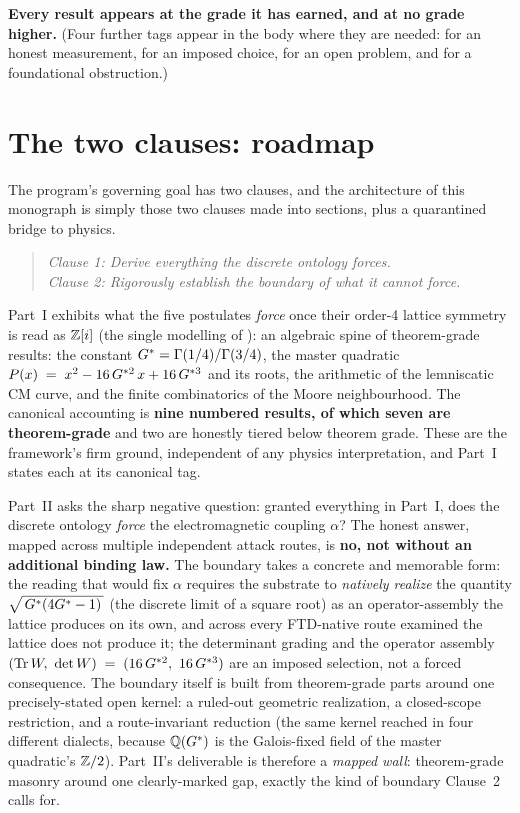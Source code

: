 \medskip
\noindent\textbf{Every result appears at the grade it has earned, and at no
grade higher.} (Four further tags appear in the body where they are
needed:  for an honest measurement,  for an imposed
choice,  for an open problem, and  for a foundational
obstruction.)

\section{The two clauses: roadmap}\label{sec:roadmap}
The program's governing goal has two clauses, and the architecture of this
monograph is simply those two clauses made into sections, plus a quarantined
bridge to physics.
\begin{quote}\itshape
  Clause 1: Derive everything the discrete ontology forces.\\
  Clause 2: Rigorously establish the boundary of what it cannot force.
\end{quote}

 Part~I exhibits what the
five postulates \emph{force} once their order-4 lattice symmetry is read as
$\mathbb{Z}[i]$ (the single modelling  of ): an algebraic spine
of theorem-grade results: the constant $G^{*}=\Gamma(1/4)/\Gamma(3/4)$, the master quadratic
$P(x) \;=\; x^{2} - 16\,G^{*2}\,x + 16\,G^{*3}$ and its roots, the arithmetic of the lemniscatic CM curve, and the
finite combinatorics of the Moore neighbourhood. The canonical accounting is
\textbf{nine numbered results, of which seven are theorem-grade} and two are
honestly tiered below theorem grade. These are the framework's firm ground,
independent of any physics interpretation, and Part~I states each at its
canonical tag.

Part~II asks the sharp negative question: granted everything in Part~I, does the
discrete ontology \emph{force} the electromagnetic coupling $\alpha$? The honest
answer, mapped across multiple independent attack routes, is \textbf{no, not
without an additional binding law.} The boundary takes a concrete and memorable
form: the reading that would fix $\alpha$ requires the substrate to
\emph{natively realize} the quantity $\sqrt{\,G^{*}(4G^{*} - 1)\,}$ (the discrete limit of a
square root) as an operator-assembly the lattice produces on its own, and
across every FTD-native route examined the lattice does not produce it; the
determinant grading and the operator assembly $(\operatorname{Tr} W,\ \det W) \;=\; (16\,G^{*2},\ 16\,G^{*3})$ are an imposed
selection, not a forced consequence. The boundary itself is built from
theorem-grade parts around one precisely-stated open kernel: a ruled-out geometric realization, a closed-scope
restriction, and a route-invariant reduction (the same kernel reached in four
different dialects, because $\mathbb{Q}(G^{*})$ is the Galois-fixed field of the master
quadratic's $\mathbb{Z}/2$). Part~II's
deliverable is therefore a \emph{mapped wall}: theorem-grade masonry around one
clearly-marked gap, exactly the kind of boundary Clause~2 calls for.

